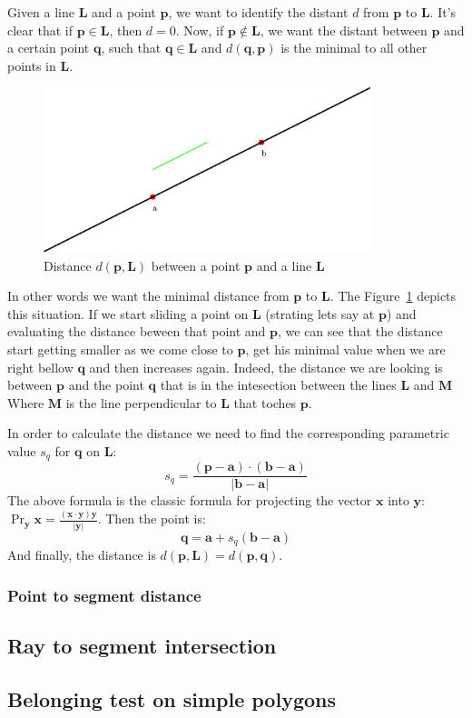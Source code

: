 Given a line $\mathbf{L}$ and a point $\mathbf{p}$, we want to identify the distant $d$ from $\mathbf{p}$ to $\mathbf{L}$.
It's clear that if $\mathbf{p} \in \mathbf{L}$, then $d = 0$.
Now, if $\mathbf{p} \notin \mathbf{L}$, we want the distant between $\mathbf{p}$ and a certain point $\mathbf{q}$, such that $\mathbf{q} \in \mathbf{L}$ and $d(\mathbf{q}, \mathbf{p})$ is the minimal to all other points in $\mathbf{L}$.

\begin{figure}[htb]
  \centering
  \includegraphics[width=0.85\textwidth]{img/line}
  \caption{Distance $d(\mathbf{p}, \mathbf{L})$ between a point $\mathbf{p}$ and a line $\mathbf{L}$}
  \label{fig:point2line}
\end{figure}

In other words we want the minimal distance from $\mathbf{p}$ to $\mathbf{L}$.
The Figure~\ref{fig:point2line} depicts this situation.
If we start sliding a point on $\mathbf{L}$ (strating lets say at $\mathbf{p}$) and evaluating the distance beween that point and $\mathbf{p}$, we can see that the distance start getting smaller as we come close to $\mathbf{p}$, get his minimal value when we are right bellow $\mathbf{q}$ and then increases again. 
Indeed, the distance we are looking is between $\mathbf{p}$ and the point $\mathbf{q}$ that is in the intesection between the lines $\mathbf{L}$ and $\mathbf{M}$
Where $\mathbf{M}$ is the line perpendicular to $\mathbf{L}$ that toches $\mathbf{p}$. 

In order to calculate the distance we need to find the corresponding parametric value $s_q$ for $\mathbf{q}$ on $\mathbf{L}$: 
\begin{equation}
s_q = \dfrac{(\mathbf{p} - \mathbf{a}) \cdot (\mathbf{b} - \mathbf{a})}{|\mathbf{b} - \mathbf{a}|}
\label{eq:scalarq}
\end{equation}
The above formula is the classic formula for projecting the vector $\mathbf{x}$ into $\mathbf{y}$: $\Pr_\mathbf{y} \mathbf{x} = \frac{(\mathbf{x} \cdot \mathbf{y}) \mathbf{y}}{|\mathbf{y}|}$.
Then the point is:
\begin{equation}
\mathbf{q} = \mathbf{a} + s_q (\mathbf{b} -\mathbf{a})
\label{eq:pointq}
\end{equation}
And finally, the distance is $d(\mathbf{p}, \mathbf{L}) = d(\mathbf{p}, \mathbf{q})$.
\subsubsection{Point to segment distance}
\subsection{Ray to segment intersection}
\subsection{Belonging test on simple polygons}

